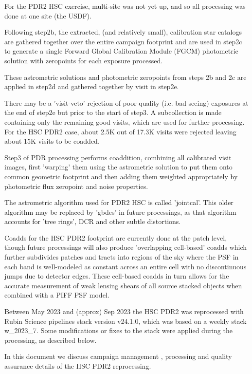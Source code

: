 For the PDR2 HSC exercise, multi-site was not yet up, and so all processing
was done at one site (the USDF).

Following step2b, the extracted, (and relatively small),
calibration star catalogs are gathered together over the entire campaign
footprint and are used in step2c to generate a single Forward 
Global Calibration Module (FGCM) photometric solution with zeropoints for
each exposure processed.

These astrometric solutions and photometric zeropoints from steps 2b and 2c
are applied in step2d and gathered together by visit in step2e.

There may be a 'visit-veto' rejection of poor quality (i.e. bad seeing)
exposures at the end of step2e but prior to the start of step3.  A subcollection is made containing only the remaining good visits, which are used for
further processing.  For the HSC PDR2 case, about 2.5K out of 17.3K visits
were rejected leaving about 15K visits to be coadded.

Step3 of PDR processing performs coaddition, combining all calibrated 
visit images, first 'warping' them using the astrometric solution to put 
them onto common geometric footprint and then adding them weighted appropriately
by photometric flux zeropoint and noise properties.

The astrometric algorithm used for PDR2 HSC is called 'jointcal'.  This
older algorithm may be replaced by 'gbdes' in future processings, as that
algorithm accounts for 'tree rings', DCR and other subtle distortions.

Coadds for the HSC PDR2 footprint are currently done at the patch 
level, though future processings will also produce 'overlapping cell-based' 
coadds which further subdivides patches and tracts 
into regions of the sky where the PSF in each band is well-modeled as constant 
across an entire cell with no discontinuous jumps due to detector edges.
These cell-based coadds in turn allows for the accurate measurement of 
weak lensing shears of all source stacked objects when combined with
a PIFF PSF model.

Between May 2023 and (approx) Sep 2023 the HSC PDR2 was reprocessed with 
Rubin Science pipelines stack version v24.1.0, which was 
based on a weekly stack w\_2023\_7.  Some modifications or fixes to the stack
were applied during the processing, as described below.

In this document we discuss campaign management ,
processing  and quality 
assurance  details of the HSC PDR2 reprocessing.


